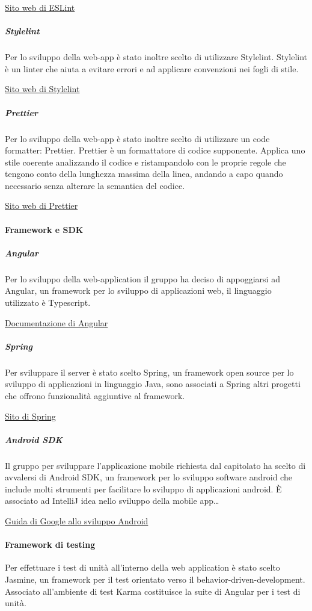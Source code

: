 \documentclass[../../norme-di-progetto.tex]{subfiles}
\begin{document}
\href{https://eslint.org/}{Sito web di ESLint}

\subparagraph{Stylelint}%
\label{subp:stylelint}
Per lo sviluppo della web-app è stato inoltre scelto di utilizzare Stylelint.
Stylelint è un linter che aiuta a evitare errori e ad applicare convenzioni nei fogli di stile.

\href{https://stylelint.io/}{Sito web di Stylelint}

\subparagraph{Prettier}%
\label{subp:prettier}
Per lo sviluppo della web-app è stato inoltre scelto di utilizzare un code formatter: Prettier.
Prettier è un formattatore di codice supponente. Applica uno stile coerente analizzando il codice e ristampandolo con le proprie regole che tengono conto della lunghezza massima della linea, andando a capo quando necessario senza alterare la semantica del codice.

\href{https://prettier.io/}{Sito web di Prettier}

\paragraph{Framework e SDK}%
\label{par:framework_sdk}

\subparagraph{Angular}%
\label{subp:angular}
Per lo sviluppo della web-application il gruppo ha deciso di appoggiarsi ad Angular, un framework per lo sviluppo di applicazioni web, il linguaggio utilizzato è Typescript.

\href{https://angular.io/docs}{Documentazione di Angular}

\subparagraph{Spring}%
\label{subp:spring}
Per sviluppare il server è stato scelto Spring, un framework open source per lo sviluppo di applicazioni in linguaggio Java, sono associati a Spring altri progetti che offrono funzionalità aggiuntive al framework.

\href{https://spring.io/}{Sito di Spring}

\subparagraph{Android SDK}%
\label{subp:android_sdk}
Il gruppo per sviluppare l'applicazione mobile richiesta dal capitolato ha scelto di avvalersi di Android SDK, un framework per lo sviluppo software android che include molti strumenti per facilitare lo sviluppo di applicazioni android.
È associato ad IntelliJ idea nello sviluppo della mobile app\dots

\href{https://developer.android.com/guide}{Guida di Google allo sviluppo Android}

\paragraph{Framework di testing}%
\label{par:framework_test}
Per effettuare i test di unità all'interno della web application è stato scelto Jasmine, un framework per il test orientato verso il behavior-driven-development.
Associato all'ambiente di test Karma costituisce la suite di Angular per i test di unità.
\end{document}
